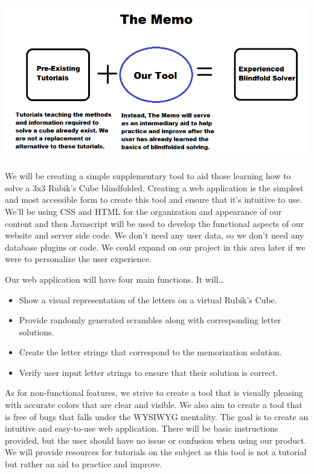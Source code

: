 \documentclass[12pt]{article}
\begin{document}
\includegraphics[width = \textwidth]{the_memo_diagram_shit.png}

\par
We will be creating a simple supplementary tool to aid those learning how to solve a 3x3 Rubik’s Cube blindfolded. Creating a web application is the simplest and most accessible form to create this tool and ensure that it’s intuitive to use. We’ll be using CSS and HTML for the organization and appearance of our content and then Javascript will be used to develop the functional aspects of our website and server side code. We don’t need any user data, so we don’t need any database plugins or code. We could expand on our project in this area later if we were to personalize the user experience.
\par
Our web application will have four main functions. It will…
\begin{itemize}
\item Show a visual representation of the letters on a virtual Rubik’s Cube.
\item Provide randomly generated scrambles along with corresponding letter solutions.
\item Create the letter strings that correspond to the memorization solution. 
\item Verify user input letter strings to ensure that their solution is correct. 
\end{itemize}
\par
As for non-functional features, we strive to create a tool that is visually pleasing with accurate colors that are clear and visible. We also aim to create a tool that is free of bugs that falls under the WYSIWYG mentality. The goal is to create an intuitive and easy-to-use web application. There will be basic instructions provided, but the user should have no issue or confusion when using our product. We will provide resources for tutorials on the subject as this tool is not a tutorial but rather an aid to practice and improve.
\end{document}
